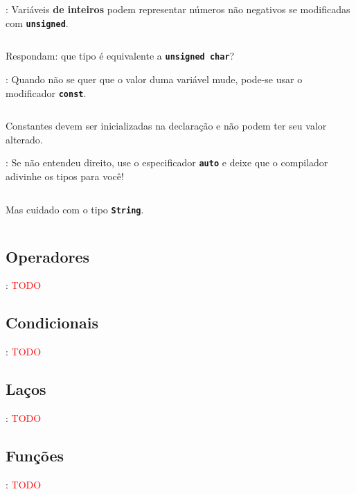 \begin{frame}{\insertsection: \insertsubsection}
  Variáveis \textbf{de inteiros} podem representar números não negativos se modificadas com \textbf{\texttt{\textcolor{CustomOrange}{unsigned}}}.
  \inputminted[firstline=4,lastline=8]{arduino}{sketches/introLinguagem/variaveis.ino}

  \pause
  Respondam: que tipo é equivalente a \textbf{\texttt{\textcolor{CustomOrange}{unsigned~char}}}?\\
\end{frame}


\begin{frame}{\insertsection: \insertsubsection}
  Quando não se quer que o valor duma variável mude, pode-se usar o modificador \textbf{\texttt{\textcolor{CustomOrange}{const}}}.

  \inputminted[firstline=10,lastline=11]{arduino}{sketches/introLinguagem/variaveis.ino}

  Constantes devem ser inicializadas na declaração e não podem ter seu valor alterado.
\end{frame}


\begin{frame}{\insertsection: \insertsubsection}
  Se não entendeu direito, use o especificador \textbf{\texttt{\textcolor{CustomOrange}{auto}}} e deixe que o compilador adivinhe os tipos para você!
  \inputminted[firstline=13,lastline=17]{arduino}{sketches/introLinguagem/variaveis.ino}

  \pause
  Mas cuidado com o tipo \textbf{\texttt{\textcolor{CustomOrange}{String}}}.
  \inputminted[firstline=19,lastline=23]{arduino}{sketches/introLinguagem/variaveis.ino}
\end{frame}


\subsection{Operadores}


\begin{frame}{\insertsection: \insertsubsection}
  \textcolor{red}{TODO}
\end{frame}


\subsection{Condicionais}


\begin{frame}{\insertsection: \insertsubsection}
  \textcolor{red}{TODO}
\end{frame}


\subsection{Laços}


\begin{frame}{\insertsection: \insertsubsection}
  \textcolor{red}{TODO}
\end{frame}


\subsection{Funções}


\begin{frame}{\insertsection: \insertsubsection}
  \textcolor{red}{TODO}
\end{frame}
